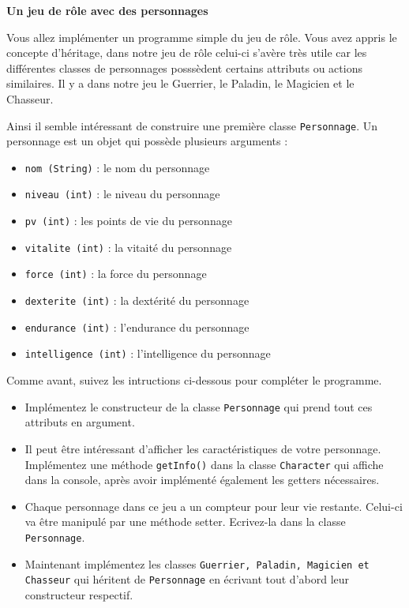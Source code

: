 \begin{Exercice}[15 minutes]\textbf{Un jeu de rôle avec des personnages}

Vous allez implémenter un programme simple du jeu de rôle. Vous avez appris le concepte d’héritage, dans notre jeu de rôle celui-ci s’avère très utile car les différentes classes de personnages posssèdent certains attributs ou actions similaires. Il y a dans notre jeu le Guerrier, le Paladin, le Magicien et le Chasseur. 

Ainsi il semble intéressant de construire une première classe \lstinline{Personnage}. Un personnage est un objet qui possède plusieurs arguments :
\begin{itemize}
    \item \lstinline{nom (String)} : le nom du personnage
    \item \lstinline{niveau (int)} : le niveau du personnage
    \item \lstinline{pv (int)} : les points de vie du personnage
    \item \lstinline{vitalite (int)} : la vitaité du personnage
    \item \lstinline{force (int)} : la force du personnage
    \item \lstinline{dexterite (int)} : la dextérité du personnage
    \item \lstinline{endurance (int)} : l’endurance du personnage
    \item \lstinline{intelligence (int)} : l’intelligence du personnage

\end{itemize}

Comme avant, suivez les intructions ci-dessous pour compléter le programme.

\begin{itemize}
    \item Implémentez le constructeur de la classe \lstinline{Personnage} qui prend tout ces attributs en argument. 
    \item Il peut être intéressant d’afficher les caractéristiques de votre personnage. Implémentez une méthode \lstinline{getInfo()} dans la classe \lstinline{Character} qui affiche dans la console, après avoir implémenté également les getters nécessaires.
    \item Chaque personnage dans ce jeu a un compteur pour leur vie restante. Celui-ci va être manipulé par une méthode setter. Ecrivez-la dans la classe \lstinline{Personnage}.
    \item Maintenant implémentez les classes \lstinline{Guerrier, Paladin, Magicien et Chasseur} qui héritent de \lstinline{Personnage} en écrivant tout d’abord leur constructeur respectif. 
    

\end{itemize}
\end{Exercice}
